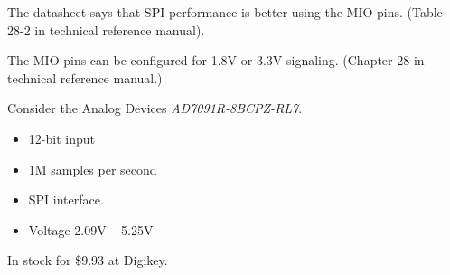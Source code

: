 \documentclass{article}
\begin{document}
The datasheet says that SPI performance is better using the MIO pins. (Table 28-2 in technical reference manual). 

The MIO pins can be configured for 1.8V or 3.3V signaling. (Chapter 28 in technical reference manual.)

Consider the Analog Devices {\em AD7091R-8BCPZ-RL7}.

\begin{itemize}
\item 12-bit input
\item 1M samples per second
\item SPI interface.
\item Voltage 2.09V ~ 5.25V
\end{itemize}

In stock for \$9.93 at Digikey.
\end{document}
